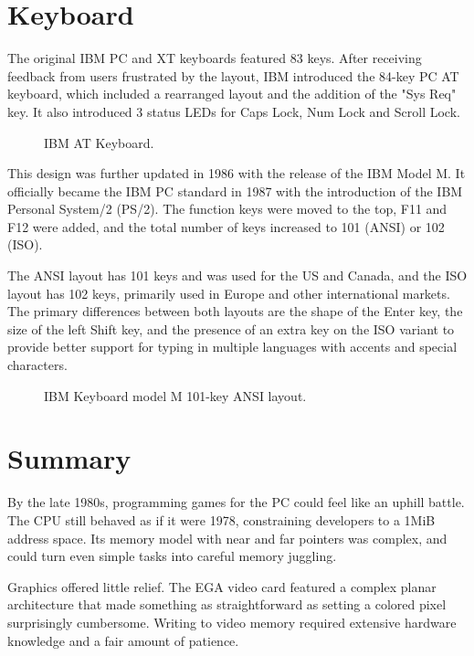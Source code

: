 \documentclass[book.tex]{subfiles}
\begin{document}
\section{Keyboard}
The original IBM PC and XT keyboards featured 83 keys. After receiving feedback from users frustrated by the layout, IBM introduced the 84-key PC AT keyboard, which included a rearranged layout and the addition of the "Sys Req" key. It also introduced 3 status LEDs for Caps Lock, Num Lock and Scroll Lock.

\begin{figure}[H] 
  \centering 
  \caption{IBM AT Keyboard.}
\end{figure}

\par
This design was further updated in 1986 with the release of the IBM Model M. It officially became the IBM PC standard in 1987 with the introduction of the IBM Personal System/2 (PS/2). The function keys were moved to the top, F11 and F12 were added, and the total number of keys increased to 101 (ANSI) or 102 (ISO).\\

\par
The ANSI layout has 101 keys and was used for the US and Canada, and the ISO layout has 102 keys, primarily used in Europe and other international markets. The primary differences between both layouts are the shape of the Enter key, the size of the left Shift key, and the presence of an extra key on the ISO variant to provide better support for typing in multiple languages with accents and special characters.

\begin{figure}[H] 
  \centering 
  \caption{IBM Keyboard model M 101-key ANSI layout.}
\end{figure}



\section{Summary}
By the late 1980s, programming games for the PC could feel like an uphill battle. The CPU still behaved as if it were 1978, constraining developers to a 1MiB address space. Its memory model with near and far pointers was complex, and could turn even simple tasks into careful memory juggling.\\

\par
Graphics offered little relief. The EGA video card featured a complex planar architecture that made something as straightforward as setting a colored pixel surprisingly cumbersome. Writing to video memory required extensive hardware knowledge and a fair amount of patience.\\
\end{document}
